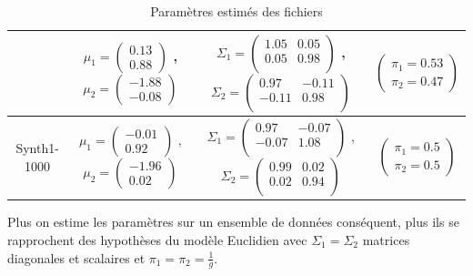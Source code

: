 \documentclass[a4paper,10pt]{report}
\begin{document}
\begin{table}[H]
\begin{tabular}{c|c|c|c}
		& 	$\mu_{1} = 
		\begin{pmatrix}
		0.13 \\ 
		0.88	
		\end{pmatrix} $ , 
		$\mu_{2} = 
		\begin{pmatrix}
		-1.88 \\ 
		-0.08
		\end{pmatrix} $ 
		&  	$\Sigma_{1} = 
		\begin{pmatrix}
		1.05 & 0.05\\
		0.05 & 0.98\\
		\end{pmatrix} $ , 
		$\Sigma_{2} = 
		\begin{pmatrix}
		0.97 & -0.11\\
		-0.11 & 0.98\\
		\end{pmatrix} $
		& 	$\begin{pmatrix} 
		\pi_{1} = 0.53\\
		\pi_{2} = 0.47
		\end{pmatrix}$\\ 
		\hline
		\small Synth1-1000 
		& 	$\mu_{1} = 
		\begin{pmatrix}
		-0.01 \\ 
		0.92
		\end{pmatrix} $ , 
		$\mu_{2} = 
		\begin{pmatrix}
		-1.96 \\ 
		0.02
		\end{pmatrix} $ 
		&  	$\Sigma_{1} = 
		\begin{pmatrix}
		0.97 & -0.07\\
		-0.07 & 1.08\\
		\end{pmatrix} $ , 
		$\Sigma_{2} = 
		\begin{pmatrix}
		0.99 & 0.02\\
		0.02 & 0.94\\
		\end{pmatrix} $
		&	 $\begin{pmatrix} 
		\pi_{1} = 0.5\\
		\pi_{2} = 0.5
		\end{pmatrix}$\\ 
	\end{tabular}
	\caption{\small Paramètres estimés des fichiers}
	\label{table:1-2-parametres-Synth1}
\end{table}


Plus on estime les paramètres sur un ensemble de données conséquent, plus ils se rapprochent des hypothèses du modèle Euclidien avec $\Sigma_{1} = \Sigma_{2}$ matrices diagonales et scalaires et $\pi_{1} = \pi_{2} = \frac{1}{g}$.
\end{document}
